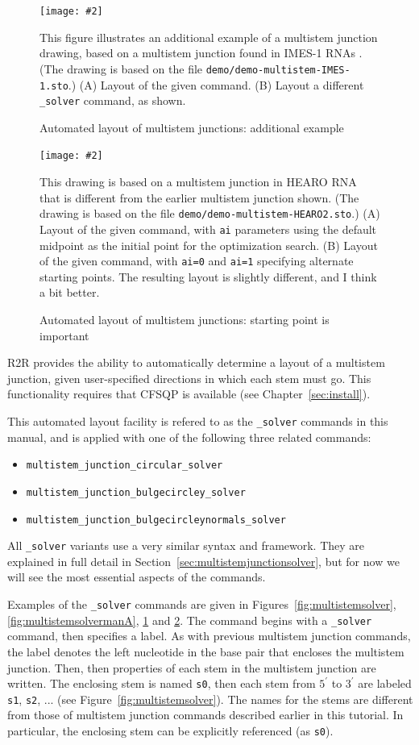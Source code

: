 \documentclass[letterpaper,12pt]{report}
\newcommand{\fig}[4]{
\begin{figure}
\texttt{[image: \#2]}
\caption{#3}

\begin{small}
#4
\end{small}
\label{#1}
\end{figure}
}
\begin{document}
\fig{fig:multistemsolverIMESone}{figures/multistem-solver-IMES-1.pdf}{Automated layout of multistem junctions: additional example}{
This figure illustrates an additional example of a multistem junction drawing, based on a multistem junction
found in IMES-1 RNAs \cite{CoolRNAs}.
(The drawing is based on the file {\tt demo/demo-multistem-IMES-1.sto}.)
(A)
Layout of the given command.
(B)
Layout a different {\tt \_solver} command, as shown.
}
\fig{fig:multistemsolverHEAROtwo}{figures/multistem-solver-HEARO2.pdf}{Automated layout of multistem junctions: starting point is important}{
This drawing is based on a multistem junction in HEARO RNA \cite{CoolRNAs} that is different from the earlier multistem junction shown.
(The drawing is based on the file {\tt demo/demo-multistem-HEARO2.sto}.)
(A)
Layout of the given command, with {\tt ai} parameters using the default midpoint as the initial point for the optimization search.
(B)
Layout of the given command, with {\tt ai=0} and {\tt ai=1} specifying alternate starting points.
The resulting layout is slightly different, and I think a bit better.
}
R2R provides the ability to automatically determine a layout of a
multistem junction, given user-specified directions in which each
stem must go.
This functionality requires that CFSQP is available (see
Chapter~\ref{sec:install}).

This automated layout facility is refered to as the {\tt \_solver} commands
in this manual, and is applied with one of the following three
related commands:
\begin{itemize}
\item {\tt multistem\_junction\_circular\_solver}
\item {\tt multistem\_junction\_bulgecircley\_solver}
\item {\tt multistem\_junction\_bulgecircleynormals\_solver}
\end{itemize}
All {\tt \_solver} variants use a very similar syntax and framework.
They are explained in full detail in Section~\ref{sec:multistemjunctionsolver},
but for now we will see the most essential aspects of the commands.

Examples of the {\tt \_solver} commands are given in Figures~\ref{fig:multistemsolver}, \ref{fig:multistemsolvermanA}, \ref{fig:multistemsolverIMESone} and \ref{fig:multistemsolverHEAROtwo}.
The command begins with a {\tt \_solver} command, then specifies a label.
As with previous multistem junction commands, the label denotes the left nucleotide in the base pair
that encloses the multistem junction.
Then, then properties of each stem in the multistem junction are written.
The enclosing stem is named {\tt s0}, then each stem from $5^\prime$ to $3^\prime$ are labeled
{\tt s1}, {\tt s2}, ... (see Figure~\ref{fig:multistemsolver}).
The names for the stems are different from those of multistem junction commands described earlier in this tutorial.  In particular, the enclosing stem can be explicitly referenced (as {\tt s0}).
\end{document}
